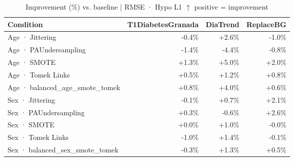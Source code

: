 \begin{table}[htbp]
\centering
\small
\caption{Improvement (\%) vs. baseline  |  RMSE · Hypo L1  $\uparrow$ positive = improvement}
\label{tab:delta_rmse_tbr_1_family_mechanism_guided}
\begin{tabular}{lrrr}
\toprule
\textbf{Condition} & \textbf{T1DiabetesGranada} & \textbf{DiaTrend} & \textbf{ReplaceBG} \\
\midrule
Age · Jittering & \textcolor{BrickRed}{-0.4\%} & \textcolor{OliveGreen}{+2.6\%} & \textcolor{BrickRed}{-1.0\%} \\
Age · PAUndersampling & \textcolor{BrickRed}{-1.4\%} & \textcolor{BrickRed}{-4.4\%} & \textcolor{BrickRed}{-0.8\%} \\
Age · SMOTE & \textcolor{OliveGreen}{+1.3\%} & \textcolor{OliveGreen}{+5.0\%} & \textcolor{OliveGreen}{+2.0\%} \\
Age · Tomek Links & \textcolor{OliveGreen}{+0.5\%} & \textcolor{OliveGreen}{+1.2\%} & \textcolor{OliveGreen}{+0.8\%} \\
Age · balanced_age_smote_tomek & \textcolor{OliveGreen}{+0.8\%} & \textcolor{OliveGreen}{+4.0\%} & \textcolor{OliveGreen}{+0.6\%} \\
\midrule
Sex · Jittering & \textcolor{BrickRed}{-0.1\%} & \textcolor{OliveGreen}{+0.7\%} & \textcolor{OliveGreen}{+2.1\%} \\
Sex · PAUndersampling & \textcolor{OliveGreen}{+0.3\%} & \textcolor{BrickRed}{-0.6\%} & \textcolor{OliveGreen}{+2.6\%} \\
Sex · SMOTE & \textcolor{OliveGreen}{+0.0\%} & \textcolor{OliveGreen}{+1.0\%} & \textcolor{BrickRed}{-0.0\%} \\
Sex · Tomek Links & \textcolor{BrickRed}{-1.0\%} & \textcolor{OliveGreen}{+1.4\%} & \textcolor{BrickRed}{-0.1\%} \\
Sex · balanced_sex_smote_tomek & \textcolor{BrickRed}{-0.3\%} & \textcolor{OliveGreen}{+1.3\%} & \textcolor{OliveGreen}{+0.5\%} \\
\bottomrule
\end{tabular}
\end{table}